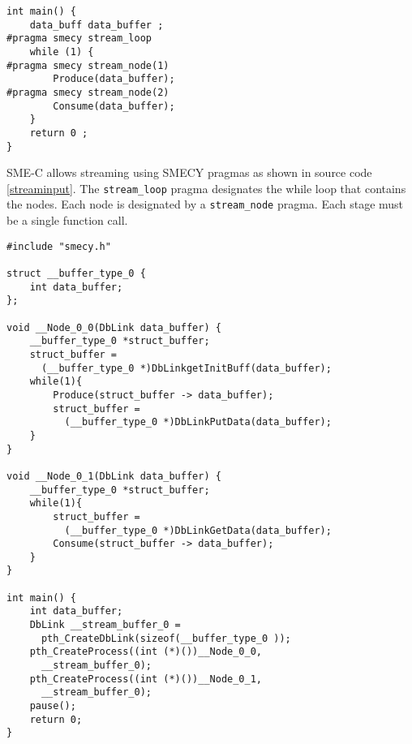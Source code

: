 \documentclass[a4paper]{article}
\begin{document}
	\begin{lstlisting}[label=streaminput,caption={Input code with streaming pragmas. Definitions of functions \texttt{Produce} and \texttt{Consume} are not shown.}]
int main() {
	data_buff data_buffer ;
#pragma smecy stream_loop
	while (1) {
#pragma smecy stream_node(1)
		Produce(data_buffer);
#pragma smecy stream_node(2)
		Consume(data_buffer);
	}
	return 0 ;
}
	\end{lstlisting}
	
	SME-C allows streaming using SMECY pragmas as shown in source code \ref{streaminput}. The \verb+stream_loop+ pragma designates the while loop that contains the nodes. Each node is designated by a \verb+stream_node+ pragma. Each stage must be a single function call.
	
	\begin{lstlisting}[label=streamoutput,caption={Possible output code. Definitions of functions \texttt{Produce} and \texttt{Consume} are not shown.}]
#include "smecy.h" 

struct __buffer_type_0 {
	int data_buffer;
};

void __Node_0_0(DbLink data_buffer) {
	__buffer_type_0 *struct_buffer;
	struct_buffer =
	  (__buffer_type_0 *)DbLinkgetInitBuff(data_buffer);
	while(1){
		Produce(struct_buffer -> data_buffer);
		struct_buffer = 
		  (__buffer_type_0 *)DbLinkPutData(data_buffer);
	}
}

void __Node_0_1(DbLink data_buffer) {
	__buffer_type_0 *struct_buffer;
	while(1){
		struct_buffer = 
		  (__buffer_type_0 *)DbLinkGetData(data_buffer);
		Consume(struct_buffer -> data_buffer);
	}
}

int main() {
	int data_buffer;
	DbLink __stream_buffer_0 = 
	  pth_CreateDbLink(sizeof(__buffer_type_0 ));
	pth_CreateProcess((int (*)())__Node_0_0,
	  __stream_buffer_0);
	pth_CreateProcess((int (*)())__Node_0_1,
	  __stream_buffer_0);
	pause();
	return 0;
}
	\end{lstlisting}
	
\end{document}
